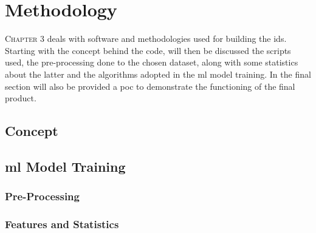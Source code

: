 \chapter{Methodology}
\label{chap:methodology}

\lettrine[lines=3, findent=3pt, nindent=0pt]{C}{hapter} 3 deals with software and methodologies used for building the \gls{ids}. Starting with the concept behind the code, will then be discussed the scripts used, the pre-processing done to the chosen dataset, along with some statistics about the latter and the algorithms adopted in the \gls{ml} model training. In the final section will also be provided a \gls{poc} to demonstrate the functioning of the final product.


\section{Concept}
\label{sec:concept}

\textcolor{dimgray}{\lipsum[1]}


\section{\gls{ml} Model Training}
\label{sec:model-training}

\textcolor{dimgray}{\lipsum[1]}


\subsection{Pre-Processing}
\label{subsec:pre-processing}

\textcolor{dimgray}{\lipsum[1]}


\subsection{Features and Statistics}
\label{subsec:features-statistics}

